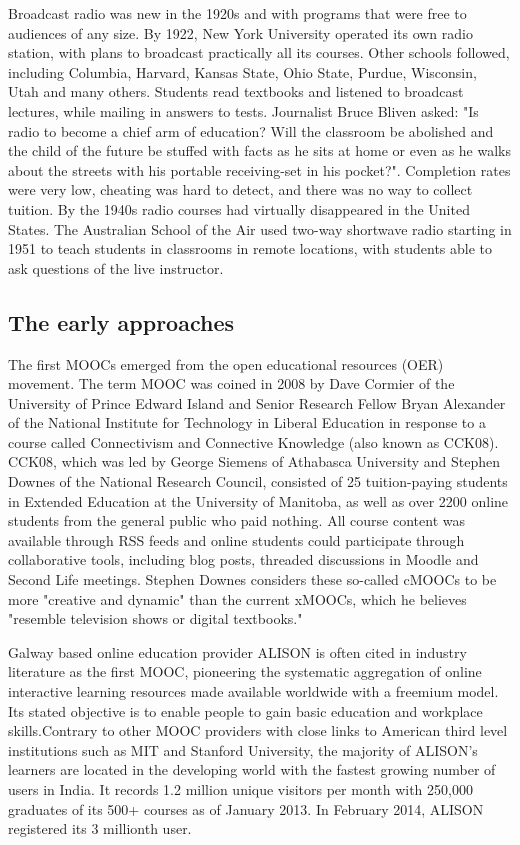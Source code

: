 Broadcast radio was new in the 1920s and with programs that were free to
audiences of any size.\citep{listening_in} By 1922, New York University operated its own radio
station, with plans to broadcast practically all its courses. Other schools
followed, including Columbia, Harvard, Kansas State, Ohio State, Purdue,
Wisconsin, Utah and many others. Students read textbooks and listened to
broadcast lectures, while mailing in answers to tests. Journalist Bruce Bliven
asked: "Is radio to become a chief arm of education? Will the classroom be
abolished and the child of the future be stuffed with facts as he sits at home
or even as he walks about the streets with his portable receiving-set in his
pocket?". Completion rates were very low, cheating was hard to detect, and
there was no way to collect tuition. By the 1940s radio courses had virtually
disappeared in the United States.\citep{before_mooc} The Australian School of the Air used
two-way shortwave radio starting in 1951 to teach students in classrooms in
remote locations, with students able to ask questions of the live instructor.

\subsection{The early approaches}
The first MOOCs emerged from the open educational resources (OER) movement. The
term MOOC was coined in 2008 by Dave Cormier of the University of Prince Edward
Island and Senior Research Fellow Bryan Alexander of the National Institute for
Technology in Liberal Education in response to a course called Connectivism and
Connective Knowledge (also known as CCK08). CCK08, which was led by George
Siemens of Athabasca University and Stephen Downes of the National Research
Council, consisted of 25 tuition-paying students in Extended Education at the
University of Manitoba, as well as over 2200 online students from the general
public who paid nothing. All course content was available through RSS feeds
and online students could participate through collaborative tools, including
blog posts, threaded discussions in Moodle and Second Life meetings.\citep{cck08}
Stephen Downes considers these so-called cMOOCs to be more "creative and
dynamic" than the current xMOOCs, which he believes "resemble television shows
or digital textbooks."\citep{courses_lack_of_creativity}

Galway based online education provider ALISON is often cited in industry
literature as the first MOOC, pioneering the systematic aggregation of online
interactive learning resources made available worldwide with a freemium
model. Its stated objective is to enable people to gain basic
education and workplace skills.Contrary to other MOOC providers with
close links to American third level institutions such as MIT and Stanford
University, the majority of ALISON's learners are located in the developing
world with the fastest growing number of users in India. It records 1.2
million unique visitors per month with 250,000 graduates of its 500+ courses as
of January 2013. In February 2014, ALISON registered its 3 millionth user.

